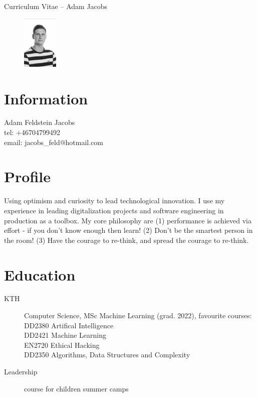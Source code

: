\documentclass[margin,line,a4paper]{resume}
\begin{document}
{\sc \Large Curriculum Vitae -- Adam Jacobs}
\begin{resume}
    \vspace{0.01cm}
    \begin{figure}
        \vspace{-1cm}
       \begin{center}
       \includegraphics[width=0.15\textwidth]{adamjacobs}
       \end{center}
        \vspace{-1cm}
    \end{figure}
    
    \section{\mysidestyle Information}%
    Adam Feldstein Jacobs \\
    tel: +46704799492 \\
    email: jacobs\_feld@hotmail.com
    \href{} \\

\section{\mysidestyle Profile}\vspace{1mm}
Using optimism and curiosity to lead technological innovation. I use my experience in leading digitalization projects and software engineering in production as a toolbox. My core philosophy are (1) performance is achieved via effort - if you don't know enough then learn! (2) Don't be the smartest person in the room! (3) Have the courage to re-think, and spread the courage to re-think.

\section{\mysidestyle Education}\vspace{1mm}
    \begin{description}
        \item[KTH] Computer Science, MSc Machine Learning (grad. 2022), favourite courses:
        \\ DD2380 Artifical Intelligence
        \\ DD2421 Machine Learning
        \\ EN2720 Ethical Hacking
        \\ DD2350 Algorithms, Data Structures and Complexity
         \item[Leadership] course for children summer camps
    \end{description} 


\end{resume}
\end{document}
